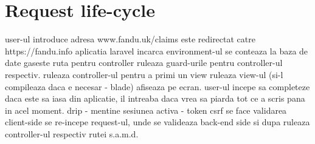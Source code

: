 \section{Request life-cycle}
	user-ul introduce adresa www.fandu.uk/claims
	este redirectat catre https://fandu.info
	aplicatia laravel incarca environment-ul
	se conteaza la baza de date
	gaseste ruta pentru controller
	ruleaza guard-urile pentru controller-ul respectiv.
	ruleaza controller-ul pentru a primi un view
	ruleaza view-ul (si-l compileaza daca e necesar - blade)
	afiseaza pe ecran.
	user-ul incepe sa completeze
		daca este sa iasa din aplicatie, il intreaba daca vrea sa piarda tot ce a scris pana in acel moment.
		drip - mentine sesiunea activa - token csrf
	se face validarea client-side
	se re-incepe request-ul, unde se valideaza back-end side si dupa ruleaza controller-ul respectiv rutei s.a.m.d.